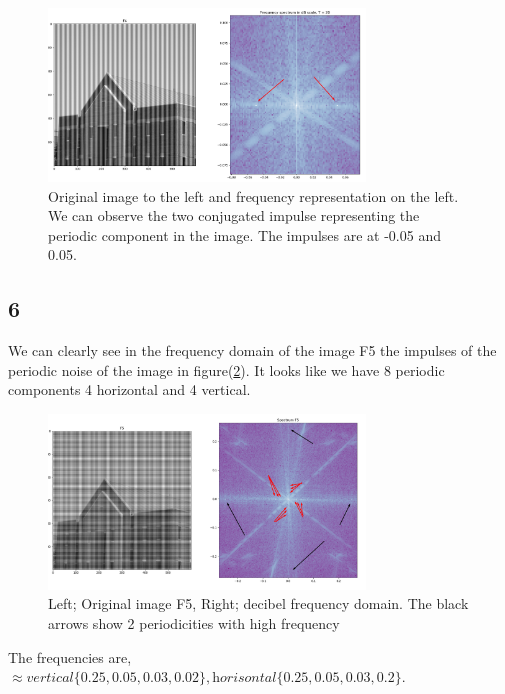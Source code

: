 {\begin{figure}[!htb]
    {\centering
        \includegraphics[width=0.75\textwidth]{simulatedperiod.png}
        \caption{Original image to the left and frequency representation on the left. We can observe the two conjugated impulse representing the periodic component in the image. The impulses are at -0.05 and 0.05.}
        \label{simulatedperiod}
    \par}
    \end{figure}




\subsection{6}


We can clearly see in the frequency domain of the image F5 the impulses of the periodic noise of the image in figure(\ref{F5period}). It looks like we have 8 periodic components 4 horizontal and 4 vertical.


\begin{figure}[!htb]
    {\centering
        \includegraphics[width=0.75\textwidth]{superpositionfreq.png}
        \caption{Left; Original image F5, Right; decibel frequency domain. The black arrows show 2 periodicities with high frequency}
        \label{F5period}
    \par}
    \end{figure}


The frequencies are, $\approx \textit{vertical}\{0.25, 0.05, 0.03, 0.02\}, \textit{horisontal}\{0.25, 0.05, 0.03, 0.2\}$.





}
